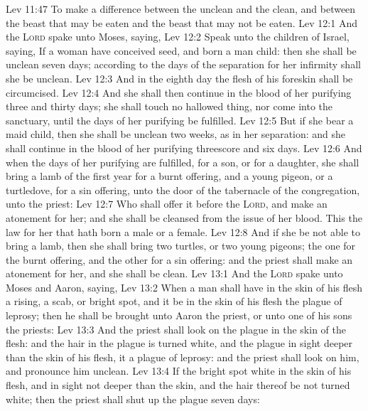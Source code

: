 \vs Lev 11:47 To make a difference between the unclean and the clean, and between the beast that may be eaten and the beast that may not be eaten.
\vs Lev 12:1 And the \textsc{Lord} spake unto Moses, saying,
\vs Lev 12:2 Speak unto the children of Israel, saying, If a woman have conceived seed, and born a man child: then she shall be unclean seven days; according to the days of the separation for her infirmity shall she be unclean.
\vs Lev 12:3 And in the eighth day the flesh of his foreskin shall be circumcised.
\vs Lev 12:4 And she shall then continue in the blood of her purifying three and thirty days; she shall touch no hallowed thing, nor come into the sanctuary, until the days of her purifying be fulfilled.
\vs Lev 12:5 But if she bear a maid child, then she shall be unclean two weeks, as in her separation: and she shall continue in the blood of her purifying threescore and six days.
\vs Lev 12:6 And when the days of her purifying are fulfilled, for a son, or for a daughter, she shall bring a lamb of the first year for a burnt offering, and a young pigeon, or a turtledove, for a sin offering, unto the door of the tabernacle of the congregation, unto the priest:
\vs Lev 12:7 Who shall offer it before the \textsc{Lord}, and make an atonement for her; and she shall be cleansed from the issue of her blood. This  the law for her that hath born a male or a female.
\vs Lev 12:8 And if she be not able to bring a lamb, then she shall bring two turtles, or two young pigeons; the one for the burnt offering, and the other for a sin offering: and the priest shall make an atonement for her, and she shall be clean.
\vs Lev 13:1 And the \textsc{Lord} spake unto Moses and Aaron, saying,
\vs Lev 13:2 When a man shall have in the skin of his flesh a rising, a scab, or bright spot, and it be in the skin of his flesh  the plague of leprosy; then he shall be brought unto Aaron the priest, or unto one of his sons the priests:
\vs Lev 13:3 And the priest shall look on the plague in the skin of the flesh: and  the hair in the plague is turned white, and the plague in sight  deeper than the skin of his flesh, it  a plague of leprosy: and the priest shall look on him, and pronounce him unclean.
\vs Lev 13:4 If the bright spot  white in the skin of his flesh, and in sight  not deeper than the skin, and the hair thereof be not turned white; then the priest shall shut up  the plague seven days:
